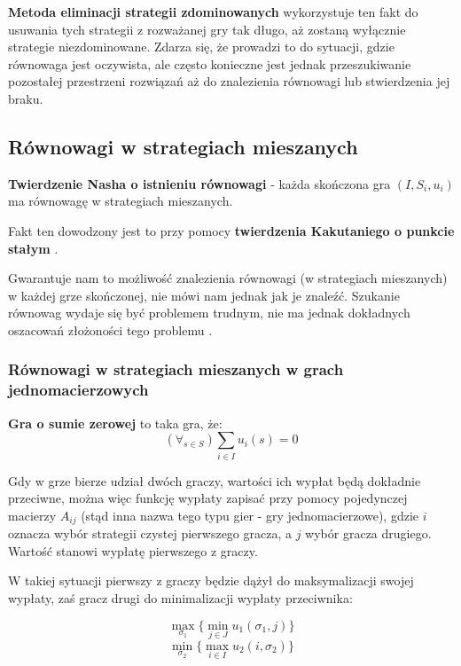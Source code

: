 \documentclass[polish]{standalone}
\begin{document}
\textbf{Metoda eliminacji strategii zdominowanych} wykorzystuje ten fakt do usuwania tych strategii z rozważanej gry
tak długo, aż zostaną wyłącznie strategie niezdominowane. Zdarza się, że prowadzi to do sytuacji, gdzie równowaga jest
oczywista, ale często konieczne jest jednak przeszukiwanie pozostałej przestrzeni rozwiązań aż do znalezienia
równowagi lub stwierdzenia jej braku.

\subsection{Równowagi w strategiach mieszanych}

\begin{theorem}
\textbf{Twierdzenie Nasha o istnieniu równowagi} - każda skończona gra $(I, S_i, u_i)$ ma równowagę w strategiach
mieszanych.
\cite[str.~29]{FT-GT}
\end{theorem}

Fakt ten dowodzony jest to przy pomocy \textbf{twierdzenia Kakutaniego o punkcie stałym} \cite[str.~29]{FT-GT}.

Gwarantuje nam to możliwość znalezienia równowagi (w strategiach mieszanych) w każdej grze skończonej, nie mówi nam
jednak jak je znaleźć. Szukanie równowag wydaje się być problemem trudnym, nie ma jednak dokładnych oszacowań złożoności
tego problemu \cite{P-AGI}.

\subsubsection{Równowagi w strategiach mieszanych w grach jednomacierzowych}

\begin{definition}
\textbf{Gra o sumie zerowej} to taka gra, że:
$$(\forall_{s \in S}) \sum_{i \in I} u_i(s) = 0$$
\cite[str.~4]{FT-GT}
\end{definition}

Gdy w grze bierze udział dwóch graczy, wartości ich wypłat będą dokładnie przeciwne, można więc funkcję wypłaty zapisać
przy pomocy pojedynczej macierzy $A_{ij}$ (stąd inna nazwa tego typu gier - gry jednomacierzowe),
gdzie $i$ oznacza wybór strategii czystej pierwszego gracza, a $j$ wybór gracza drugiego. Wartość stanowi wypłatę
pierwszego z graczy.

W takiej sytuacji pierwszy z graczy będzie dążył do maksymalizacji swojej wypłaty, zaś gracz drugi do minimalizacji
wypłaty przeciwnika:

$$\max_{\sigma_1} \{ \min_{j \in J} u_1(\sigma_1, j) \}$$
$$\min_{\sigma_2} \{ \max_{i \in I} u_2(i, \sigma_2) \}$$
\end{document}
